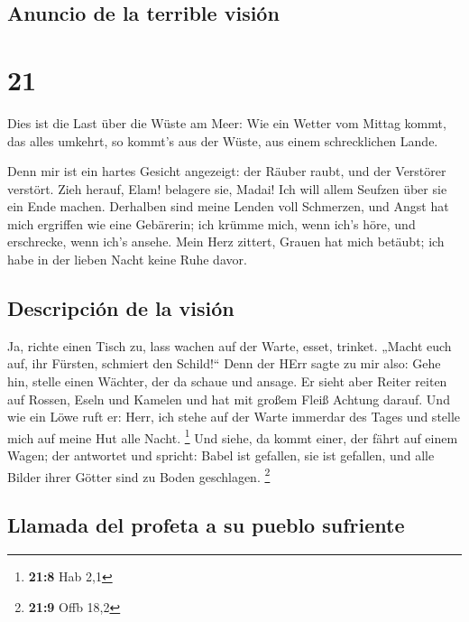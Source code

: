 \hypertarget{anuncio-de-la-terrible-visiuxf3n}{%
\subsection{Anuncio de la terrible
visión}\label{anuncio-de-la-terrible-visiuxf3n}}

\hypertarget{section-20}{%
\section{21}\label{section-20}}

 Dies ist die Last über die Wüste am Meer: Wie ein Wetter
vom Mittag kommt, das alles umkehrt, so kommt's aus der Wüste, aus einem
schrecklichen Lande.

 Denn mir ist ein hartes Gesicht angezeigt: der Räuber
raubt, und der Verstörer verstört. Zieh herauf, Elam! belagere sie,
Madai! Ich will allem Seufzen über sie ein Ende machen. 
Derhalben sind meine Lenden voll Schmerzen, und Angst hat mich ergriffen
wie eine Gebärerin; ich krümme mich, wenn ich's höre, und erschrecke,
wenn ich's ansehe.  Mein Herz zittert, Grauen hat mich
betäubt; ich habe in der lieben Nacht keine Ruhe davor.

\hypertarget{descripciuxf3n-de-la-visiuxf3n}{%
\subsection{Descripción de la
visión}\label{descripciuxf3n-de-la-visiuxf3n}}

 Ja, richte einen Tisch zu, lass wachen auf der Warte,
esset, trinket. „Macht euch auf, ihr Fürsten, schmiert den Schild!{}``
 Denn der HErr sagte zu mir also: Gehe hin, stelle einen
Wächter, der da schaue und ansage.  Er sieht aber Reiter
reiten auf Rossen, Eseln und Kamelen und hat mit großem Fleiß Achtung
darauf.  Und wie ein Löwe ruft er: Herr, ich stehe auf der
Warte immerdar des Tages und stelle mich auf meine Hut alle Nacht.
\footnote{\textbf{21:8} Hab 2,1}  Und siehe, da kommt
einer, der fährt auf einem Wagen; der antwortet und spricht: Babel ist
gefallen, sie ist gefallen, und alle Bilder ihrer Götter sind zu Boden
geschlagen. \footnote{\textbf{21:9} Offb 18,2}

\hypertarget{llamada-del-profeta-a-su-pueblo-sufriente}{%
\subsection{Llamada del profeta a su pueblo
sufriente}\label{llamada-del-profeta-a-su-pueblo-sufriente}}

